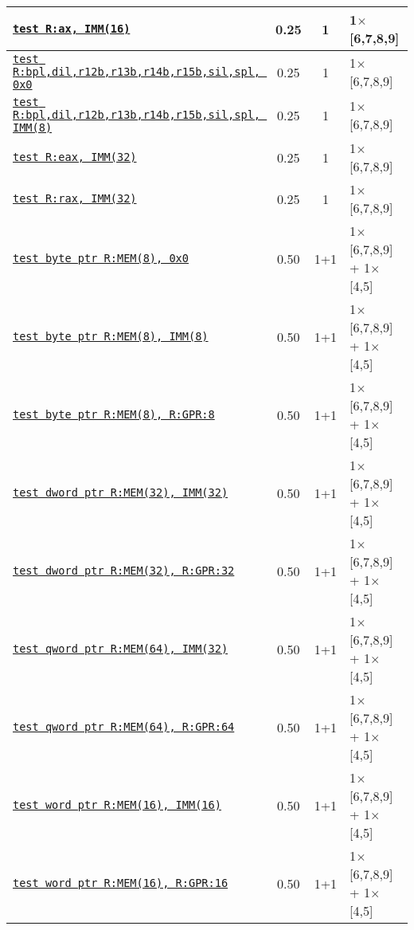 \documentclass[a4paper,english,fontsize=9]{scrartcl}
\begin{document}
\begin{longtable}{p{}ccL{.25\textwidth}}
  \midrule
  \texttt{\href{https://felixcloutier.com/x86/TEST.html}{test R:ax, IMM(16)}} & 0.25 & 1 & 1\(\times\)[6,7,8,9] \\
  \midrule
  \texttt{\href{https://felixcloutier.com/x86/TEST.html}{test R:bpl,dil,r12b,r13b,r14b,r15b,sil,spl, 0x0}} & 0.25 & 1 & 1\(\times\)[6,7,8,9] \\
  \midrule
  \texttt{\href{https://felixcloutier.com/x86/TEST.html}{test R:bpl,dil,r12b,r13b,r14b,r15b,sil,spl, IMM(8)}} & 0.25 & 1 & 1\(\times\)[6,7,8,9] \\
  \midrule
  \texttt{\href{https://felixcloutier.com/x86/TEST.html}{test R:eax, IMM(32)}} & 0.25 & 1 & 1\(\times\)[6,7,8,9] \\
  \midrule
  \texttt{\href{https://felixcloutier.com/x86/TEST.html}{test R:rax, IMM(32)}} & 0.25 & 1 & 1\(\times\)[6,7,8,9] \\
  \midrule
  \texttt{\href{https://felixcloutier.com/x86/TEST.html}{test byte ptr R:MEM(8), 0x0}} & 0.50 & 1+1 & 1\(\times\)[6,7,8,9] + 1\(\times\)[4,5] \\
  \midrule
  \texttt{\href{https://felixcloutier.com/x86/TEST.html}{test byte ptr R:MEM(8), IMM(8)}} & 0.50 & 1+1 & 1\(\times\)[6,7,8,9] + 1\(\times\)[4,5] \\
  \midrule
  \texttt{\href{https://felixcloutier.com/x86/TEST.html}{test byte ptr R:MEM(8), R:GPR:8}} & 0.50 & 1+1 & 1\(\times\)[6,7,8,9] + 1\(\times\)[4,5] \\
  \midrule
  \texttt{\href{https://felixcloutier.com/x86/TEST.html}{test dword ptr R:MEM(32), IMM(32)}} & 0.50 & 1+1 & 1\(\times\)[6,7,8,9] + 1\(\times\)[4,5] \\
  \midrule
  \texttt{\href{https://felixcloutier.com/x86/TEST.html}{test dword ptr R:MEM(32), R:GPR:32}} & 0.50 & 1+1 & 1\(\times\)[6,7,8,9] + 1\(\times\)[4,5] \\
  \midrule
  \texttt{\href{https://felixcloutier.com/x86/TEST.html}{test qword ptr R:MEM(64), IMM(32)}} & 0.50 & 1+1 & 1\(\times\)[6,7,8,9] + 1\(\times\)[4,5] \\
  \midrule
  \texttt{\href{https://felixcloutier.com/x86/TEST.html}{test qword ptr R:MEM(64), R:GPR:64}} & 0.50 & 1+1 & 1\(\times\)[6,7,8,9] + 1\(\times\)[4,5] \\
  \midrule
  \texttt{\href{https://felixcloutier.com/x86/TEST.html}{test word ptr R:MEM(16), IMM(16)}} & 0.50 & 1+1 & 1\(\times\)[6,7,8,9] + 1\(\times\)[4,5] \\
  \midrule
  \texttt{\href{https://felixcloutier.com/x86/TEST.html}{test word ptr R:MEM(16), R:GPR:16}} & 0.50 & 1+1 & 1\(\times\)[6,7,8,9] + 1\(\times\)[4,5] \\

\end{longtable}
\end{document}
